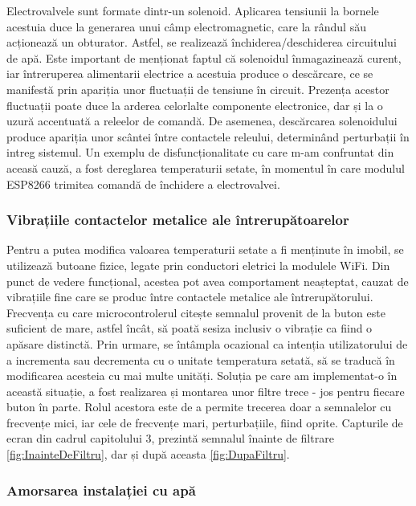 	Electrovalvele sunt formate dintr-un solenoid. Aplicarea tensiunii la bornele acestuia duce la generarea unui câmp electromagnetic, care la rândul său acționează un obturator. Astfel, se realizează închiderea/deschiderea circuitului de apă. Este important de menționat faptul că solenoidul înmagazinează curent, iar întreruperea alimentarii electrice a acestuia produce o descărcare, ce se manifestă prin apariția unor fluctuații de tensiune în circuit. Prezența acestor fluctuații poate duce la arderea celorlalte componente electronice, dar și la o uzură accentuată a releelor de comandă. De asemenea, descărcarea solenoidului produce apariția unor scântei între contactele releului, determinând perturbații în intreg sistemul. Un exemplu de disfuncționalitate cu care m-am confruntat din aceasă cauză, a fost dereglarea temperaturii setate, în momentul în care modulul ESP8266 trimitea comandă de închidere a electrovalvei.   

\subsubsection{Vibrațiile contactelor metalice ale întrerupătoarelor}

	Pentru a putea modifica valoarea temperaturii setate a fi menținute în imobil, se utilizează butoane fizice, legate prin conductori eletrici la modulele WiFi. Din punct de vedere funcțional, acestea pot avea comportament neașteptat, cauzat de vibrațiile fine care se produc între contactele metalice ale întrerupătorului. Frecvența cu care microcontrolerul citește semnalul provenit de la buton este suficient de mare, astfel încât, să poată sesiza inclusiv o vibrație ca fiind o apăsare distinctă. Prin urmare, se întâmpla ocazional ca intenția utilizatorului de a incrementa sau decrementa cu o unitate temperatura setată, să se traducă în modificarea acesteia cu mai multe unități. Soluția pe care am implementat-o în această situație, a fost realizarea și montarea unor filtre trece - jos pentru fiecare buton în parte. Rolul acestora este de a permite trecerea doar a semnalelor cu frecvențe mici, iar cele de frecvențe mari, perturbațiile, fiind oprite. Capturile de ecran din cadrul capitolului 3, prezintă semnalul înainte de filtrare \ref{fig:InainteDeFiltru}, dar și după aceasta \ref{fig:DupaFiltru}.

\subsubsection{Amorsarea instalației cu apă}

